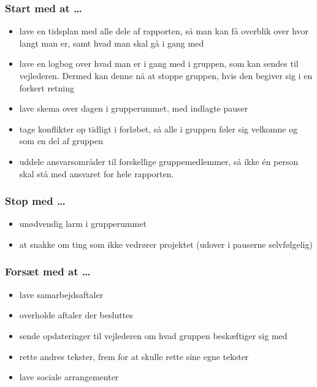 \subsubsection*{Start med at \ldots}
\begin{itemize}
	\item lave en tidsplan med alle dele af rapporten, så man kan få overblik over hvor langt man er, samt hvad man skal gå i gang med
	\item lave en logbog over hvad man er i gang med i gruppen, som kan sendes til vejlederen. Dermed kan denne nå at stoppe gruppen, hvis den begiver sig i en forkert retning
	\item lave skema over dagen i grupperummet, med indlagte pauser
	\item tage konflikter op tidligt i forløbet, så alle i gruppen føler sig velkomne og som en del af gruppen
	\item uddele ansvarsområder til forskellige gruppemedlemmer, så ikke \'en person skal stå med ansvaret for hele rapporten.
\end{itemize}
\subsubsection*{Stop med \ldots}
\begin{itemize}
	\item unødvendig larm i grupperummet
	\item at snakke om ting som ikke vedrører projektet (udover i pauserne selvfølgelig)
\end{itemize}
\subsubsection*{Forsæt med at \ldots}
\begin{itemize}
	\item lave samarbejdsaftaler
	\item overholde aftaler der besluttes
	\item sende opdateringer til vejlederen om hvad gruppen beskæftiger sig med
	\item rette andres tekster, frem for at skulle rette sine egne tekster
	\item lave sociale arrangementer
\end{itemize}